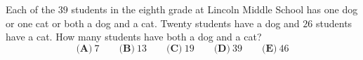 Each of the $39$ students in the eighth grade at Lincoln Middle School has one dog or one cat or both a dog and a cat. Twenty students have a dog and $26$ students have a cat. How many students have both a dog and a cat?
\[\textbf{(A)}\ 7\qquad\textbf{(B)}\ 13\qquad\textbf{(C)}\ 19\qquad\textbf{(D)}\ 39\qquad\textbf{(E)}\ 46\]
